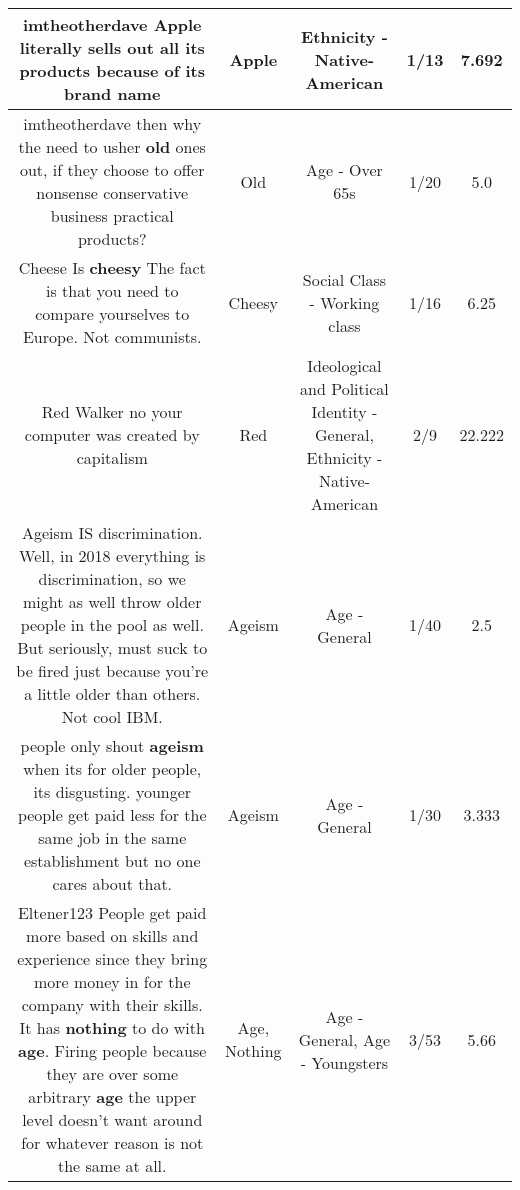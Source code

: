 \documentclass[11pt]{article}
\newlength\mylength
\begin{document}
\begin{center}
\begin{longtable}{|C{.65\mylength}|C{.30\mylength}|C{.12\mylength}|C{.12\mylength}|C{.12\mylength}|}
  \small imtheotherdave \textbf{Apple} literally sells out all its products because of its brand name\normalsize   & Apple & Ethnicity - Native-American & 1/13 & 7.692 \\  \hline
  \small imtheotherdave  then why the need to usher \textbf{old} ones out, if they choose to offer nonsense conservative business practical products?\normalsize   & Old & Age - Over 65s & 1/20 & 5.0 \\  \hline
  \small Cheese Is \textbf{cheesy} The fact is that you need to compare yourselves to Europe. Not communists.\normalsize   & Cheesy & Social Class - Working class & 1/16 & 6.25 \\  \hline
  \small Red Walker no your computer was created by capitalism\normalsize   & Red &  Ideological and Political Identity - General, Ethnicity - Native-American & 2/9 & 22.222 \\  \hline
  \small Ageism IS discrimination. Well, in 2018 everything is discrimination, so we might as well throw older people in the pool as well. But seriously, must suck to be fired just because you're a little older than others. Not cool IBM.\normalsize   & Ageism & Age - General & 1/40 & 2.5 \\  \hline
  \small people only shout \textbf{ageism} when its for older people, its disgusting. younger people get paid less for the same job in the same establishment but no one cares about that.\normalsize   & Ageism & Age - General & 1/30 & 3.333 \\  \hline
  \small Eltener123 People get paid more based on skills and experience since they bring more money in for the company with their skills. It has \textbf{nothing} to do with \textbf{age}. Firing people because they are over some arbitrary \textbf{age} the upper level doesn't want around for whatever reason is not the same at all.\normalsize   & Age, Nothing & Age - General, Age - Youngsters & 3/53 & 5.66 \\  \hline

\end{longtable}
\end{center}
\end{document}
